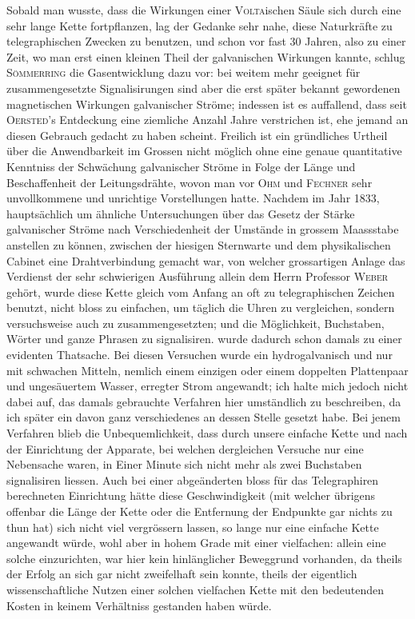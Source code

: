 Sobald man wusste, dass die Wirkungen einer \textsc{Volta}ischen Säule sich durch eine sehr lange Kette fortpflanzen, lag der Gedanke sehr nahe, diese Naturkräfte zu telegraphischen Zwecken zu benutzen, und schon vor fast 30 Jahren, also zu einer Zeit, wo man erst einen kleinen Theil der galvanischen Wirkungen kannte, schlug \textsc{Sömmerring} die Gasentwicklung dazu vor: bei weitem mehr geeignet für zusammengesetzte Signalisirungen sind aber die erst später bekannt gewordenen magnetischen Wirkungen galvanischer Ströme; indessen ist es auffallend, dass seit \textsc{Oersted}'s Entdeckung eine ziemliche Anzahl Jahre verstrichen ist, ehe jemand an diesen Gebrauch gedacht zu haben scheint. Freilich ist ein gründliches Urtheil über die Anwendbarkeit im Grossen nicht möglich ohne eine genaue quantitative Kenntniss der Schwächung galvanischer Ströme in Folge der Länge und Beschaffenheit der Leitungsdrähte, wovon man vor \textsc{Ohm} und \textsc{Fechner} sehr unvollkommene und unrichtige Vorstellungen hatte. Nachdem im Jahr 1833, hauptsächlich um ähnliche Untersuchungen über das Gesetz der Stärke galvanischer Ströme nach Verschiedenheit der Umstände in grossem Maassstabe anstellen zu können, zwischen der hiesigen Sternwarte und dem physikalischen Cabinet eine Drahtverbindung gemacht war, von welcher grossartigen Anlage das Verdienst der sehr schwierigen Ausführung allein dem Herrn Professor \textsc{Weber} gehört, wurde diese Kette gleich vom Anfang an oft zu telegraphischen Zeichen benutzt, nicht bloss zu einfachen, um täglich die Uhren zu vergleichen, sondern versuchsweise auch zu zusammengesetzten; und die Möglichkeit, Buchstaben, Wörter und ganze Phrasen zu signalisiren. wurde dadurch schon damals zu einer evidenten Thatsache. Bei diesen Versuchen wurde ein hydrogalvanisch und nur mit schwachen Mitteln, nemlich einem einzigen oder einem doppelten Plattenpaar und ungesäuertem Wasser, erregter Strom angewandt; ich halte mich jedoch nicht dabei auf, das damals gebrauchte Verfahren hier umständlich zu beschreiben, da ich später ein davon ganz verschiedenes an dessen Stelle gesetzt habe. Bei jenem Verfahren blieb die Unbequemlichkeit, dass durch unsere einfache Kette und nach der Einrichtung der Apparate, bei welchen dergleichen Versuche nur eine Nebensache waren, in Einer Minute sich nicht mehr als zwei Buchstaben signalisiren liessen. Auch bei einer abgeänderten bloss für das Telegraphiren berechneten Einrichtung hätte diese Geschwindigkeit (mit welcher übrigens offenbar die Länge der Kette oder die Entfernung der Endpunkte gar nichts zu thun hat) sich nicht viel vergrössern lassen, so lange nur eine einfache Kette angewandt würde, wohl aber in hohem Grade mit einer vielfachen: allein eine solche einzurichten, war hier kein hinlänglicher Beweggrund vorhanden, da theils der Erfolg an sich gar nicht zweifelhaft sein konnte, theils der eigentlich wissenschaftliche Nutzen einer solchen vielfachen Kette mit den bedeutenden Kosten in keinem Verhältniss gestanden haben würde.

